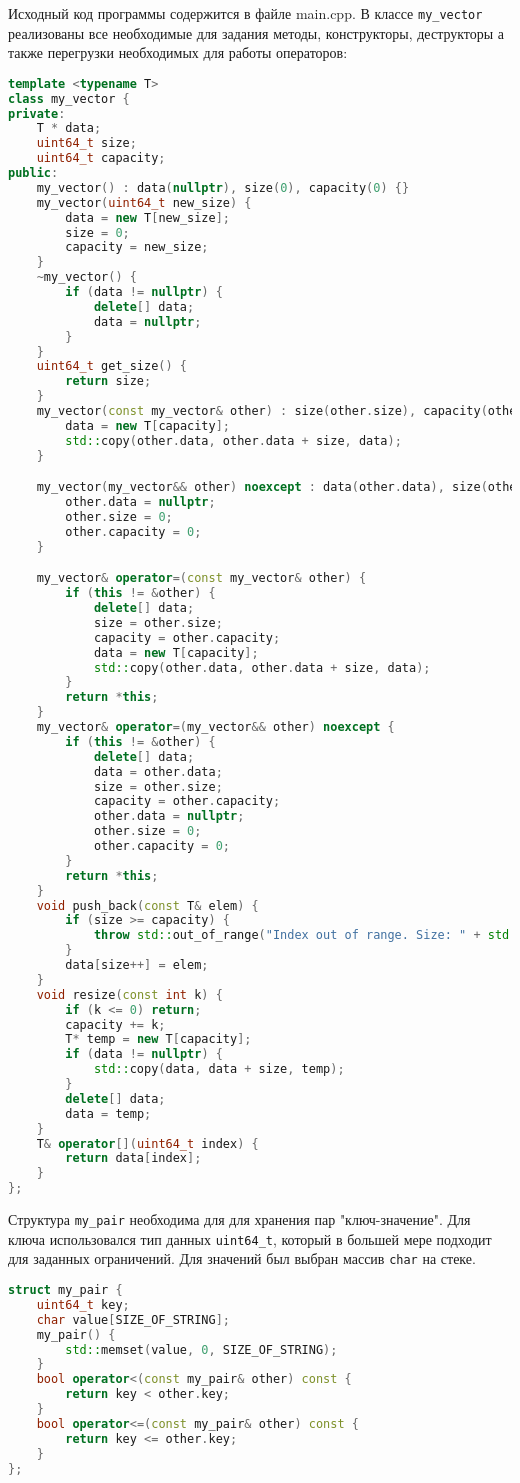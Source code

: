 \documentclass[12pt]{article}
\begin{document}
Исходный код программы содержится в файле main.cpp.
В классе \texttt{my\_vector} реализованы все необходимые для задания методы, конструкторы, деструкторы а также перегрузки необходимых для работы операторов:
\begin{lstlisting}[language=C++]
template <typename T>
class my_vector {
private:
    T * data;
    uint64_t size;
    uint64_t capacity;
public:
    my_vector() : data(nullptr), size(0), capacity(0) {}
    my_vector(uint64_t new_size) {
        data = new T[new_size];
        size = 0;
        capacity = new_size;
    }
    ~my_vector() {
        if (data != nullptr) {
            delete[] data;
            data = nullptr;
        }
    }
    uint64_t get_size() {
        return size;
    }
    my_vector(const my_vector& other) : size(other.size), capacity(other.capacity) {
        data = new T[capacity];
        std::copy(other.data, other.data + size, data);
    }

    my_vector(my_vector&& other) noexcept : data(other.data), size(other.size), capacity(other.capacity) {
        other.data = nullptr;
        other.size = 0;
        other.capacity = 0;
    }

    my_vector& operator=(const my_vector& other) {
        if (this != &other) {
            delete[] data;
            size = other.size;
            capacity = other.capacity;
            data = new T[capacity];
            std::copy(other.data, other.data + size, data);
        }
        return *this;
    }
    my_vector& operator=(my_vector&& other) noexcept {
        if (this != &other) {
            delete[] data;
            data = other.data;
            size = other.size;
            capacity = other.capacity;
            other.data = nullptr;
            other.size = 0;
            other.capacity = 0;
        }
        return *this;
    }
    void push_back(const T& elem) {
        if (size >= capacity) {
            throw std::out_of_range("Index out of range. Size: " + std::to_string(size));
        }
        data[size++] = elem;
    }
    void resize(const int k) {
        if (k <= 0) return;
        capacity += k;
        T* temp = new T[capacity];
        if (data != nullptr) {
            std::copy(data, data + size, temp);
        }
        delete[] data;
        data = temp;
    }
    T& operator[](uint64_t index) {
        return data[index];
    }
};
\end{lstlisting}
Структура \texttt{my\_pair} необходима для для хранения пар "ключ-значение". Для ключа использовался тип данных \texttt{uint64\_t}, который в большей мере подходит для заданных ограничений. Для значений был выбран массив \texttt{char} на стеке.
\begin{lstlisting}[language=C++]
struct my_pair {
    uint64_t key;
    char value[SIZE_OF_STRING];
    my_pair() {
        std::memset(value, 0, SIZE_OF_STRING);
    }
    bool operator<(const my_pair& other) const {
        return key < other.key;
    }
    bool operator<=(const my_pair& other) const {
        return key <= other.key;
    }
};
\end{lstlisting}
\end{document}
